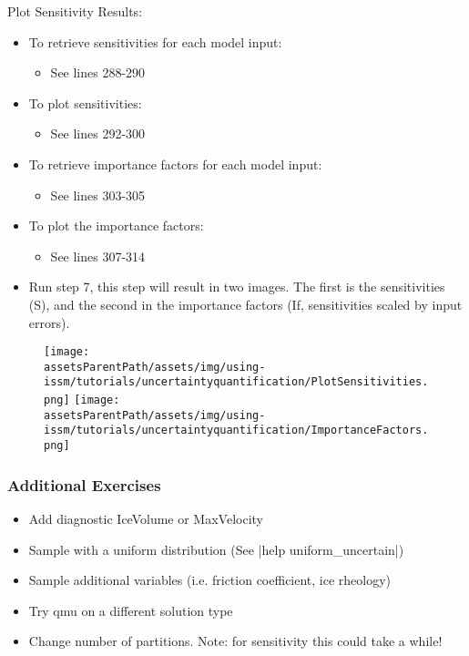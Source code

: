 Plot Sensitivity Results:
\begin{itemize}
	\item To retrieve sensitivities for each model input:
		\begin{itemize}
			\item See lines 288-290
		\end{itemize}
	\item To plot sensitivities:
		\begin{itemize}
			\item See lines 292-300
		\end{itemize}

	\item To retrieve importance factors for each model input:
		\begin{itemize}
			\item See lines 303-305
		\end{itemize}
	\item To plot the importance factors:
		\begin{itemize}
			\item See lines 307-314
		\end{itemize}

	\item Run step 7, this step will result in two images. The first is the sensitivities (S), and the second in the importance factors (If, sensitivities scaled by input errors).
\end{itemize}
\begin{figure}[H]
	\begin{center}
		\texttt{[image: \\assetsParentPath/assets/img/using-issm/tutorials/uncertaintyquantification/PlotSensitivities.png]}
		\texttt{[image: \\assetsParentPath/assets/img/using-issm/tutorials/uncertaintyquantification/ImportanceFactors.png]}
	\end{center}
\end{figure}
\subsubsection{Additional Exercises} %
\begin{itemize}
	\item Add diagnostic IceVolume or MaxVelocity
	\item Sample with a uniform distribution (See \lstinlinebg|help uniform_uncertain|)
	\item Sample additional variables (i.e. friction coefficient, ice rheology)
	\item Try qmu on a different solution type
	\item Change number of partitions. Note: for sensitivity this could take a while!
\end{itemize}

\clearpage %
